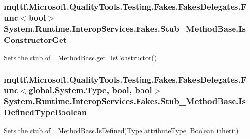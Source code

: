\hypertarget{class_system_1_1_runtime_1_1_interop_services_1_1_fakes_1_1_stub___method_base_af6d7723dbe72a2a0eba5520d54b87289}{
\subsubsection[{Is\-Constructor\-Get}]{\setlength{\rightskip}{0pt plus 5cm}mqttf.\-Microsoft.\-Quality\-Tools.\-Testing.\-Fakes.\-Fakes\-Delegates.\-Func$<$bool$>$ System.\-Runtime.\-Interop\-Services.\-Fakes.\-Stub\-\_\-\-Method\-Base.\-Is\-Constructor\-Get}}\label{class_system_1_1_runtime_1_1_interop_services_1_1_fakes_1_1_stub___method_base_af6d7723dbe72a2a0eba5520d54b87289}


Sets the stub of \-\_\-\-Method\-Base.\-get\-\_\-\-Is\-Constructor()

\hypertarget{class_system_1_1_runtime_1_1_interop_services_1_1_fakes_1_1_stub___method_base_a0becebff7306c3dde11b3de996eca3ac}{
\subsubsection[{Is\-Defined\-Type\-Boolean}]{\setlength{\rightskip}{0pt plus 5cm}mqttf.\-Microsoft.\-Quality\-Tools.\-Testing.\-Fakes.\-Fakes\-Delegates.\-Func$<$global.\-System.\-Type, bool, bool$>$ System.\-Runtime.\-Interop\-Services.\-Fakes.\-Stub\-\_\-\-Method\-Base.\-Is\-Defined\-Type\-Boolean}}\label{class_system_1_1_runtime_1_1_interop_services_1_1_fakes_1_1_stub___method_base_a0becebff7306c3dde11b3de996eca3ac}


Sets the stub of \-\_\-\-Method\-Base.\-Is\-Defined(\-Type attribute\-Type, Boolean inherit)

